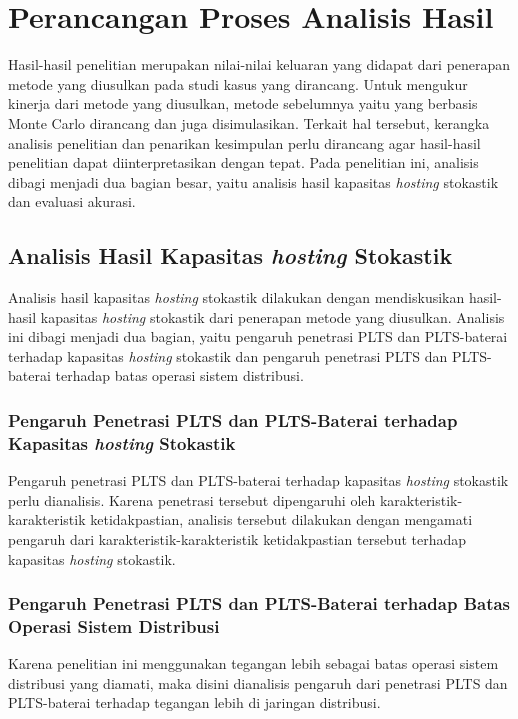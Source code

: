 {\section{Perancangan Proses Analisis Hasil}
Hasil-hasil penelitian merupakan nilai-nilai keluaran yang didapat dari penerapan metode yang diusulkan pada studi kasus yang dirancang. Untuk mengukur kinerja dari metode yang diusulkan, metode sebelumnya yaitu yang berbasis Monte Carlo dirancang dan juga disimulasikan. Terkait hal tersebut, kerangka analisis penelitian dan penarikan kesimpulan perlu dirancang agar hasil-hasil penelitian dapat diinterpretasikan dengan tepat. Pada penelitian ini, analisis dibagi menjadi dua bagian besar, yaitu analisis hasil kapasitas \textit{\textit{hosting}} stokastik dan evaluasi akurasi. 

\subsection{Analisis Hasil Kapasitas \textit{\textit{hosting}} Stokastik}
Analisis hasil kapasitas \textit{\textit{hosting}} stokastik dilakukan dengan mendiskusikan hasil-hasil kapasitas \textit{\textit{hosting}} stokastik dari penerapan metode yang diusulkan. Analisis ini dibagi menjadi dua bagian, yaitu pengaruh penetrasi PLTS dan PLTS-baterai terhadap kapasitas \textit{\textit{hosting}} stokastik dan pengaruh penetrasi PLTS dan PLTS-baterai terhadap batas operasi sistem distribusi.
\subsubsection{Pengaruh Penetrasi PLTS dan PLTS-Baterai terhadap Kapasitas \textit{\textit{hosting}} Stokastik}
Pengaruh penetrasi PLTS dan PLTS-baterai terhadap kapasitas \textit{\textit{hosting}} stokastik perlu dianalisis. Karena penetrasi tersebut dipengaruhi oleh karakteristik-karakteristik ketidakpastian, analisis tersebut dilakukan dengan mengamati pengaruh dari karakteristik-karakteristik ketidakpastian tersebut terhadap kapasitas \textit{\textit{hosting}} stokastik.

\subsubsection{Pengaruh Penetrasi PLTS dan PLTS-Baterai terhadap Batas Operasi Sistem Distribusi}
Karena penelitian ini menggunakan tegangan lebih sebagai batas operasi sistem distribusi yang diamati, maka disini dianalisis pengaruh dari penetrasi PLTS dan PLTS-baterai terhadap tegangan lebih di jaringan distribusi.
}

